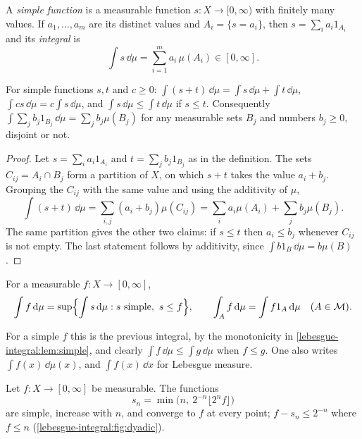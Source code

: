 \begin{notechapter}
\begin{definition}\label{lebesgue-integral:def:simple}
A \emph{simple function} is a measurable function $s:X\to[0, \infty)$
with finitely many values. If $a_1,\dots,a_m$ are its distinct values
and $A_i = \{s = a_i\}$, then $s = \sum_ia_i1_{A_i}$ and its
\emph{integral} is
\[
  \int s\,\dd\mu = \sum_{i=1}^ma_i\,\mu(A_i)\in[0, \infty] .
\]
\end{definition}

\begin{lemma}\label{lebesgue-integral:lem:simple}
For simple functions $s, t$ and $c\geq0$:
$\int(s + t)\,\dd\mu = \int s\,\dd\mu + \int t\,\dd\mu$,
$\int cs\,\dd\mu = c\int s\,\dd\mu$, and
$\int s\,\dd\mu\leq\int t\,\dd\mu$ if $s\leq t$. Consequently
$\int\sum_jb_j1_{B_j}\,\dd\mu = \sum_jb_j\mu(B_j)$ for any measurable sets
$B_j$ and numbers $b_j\geq0$, disjoint or not.
\end{lemma}

\begin{proof}
Let $s = \sum_ia_i1_{A_i}$ and $t = \sum_jb_j1_{B_j}$ as in the
definition. The sets $C_{ij} = A_i\cap B_j$ form a partition of $X$, on
which $s + t$ takes the value $a_i + b_j$. Grouping the $C_{ij}$ with
the same value and using the additivity of $\mu$,
\[
  \int(s + t)\,\dd\mu = \sum_{i,j}(a_i + b_j)\mu(C_{ij})
  = \sum_ia_i\mu(A_i) + \sum_jb_j\mu(B_j) .
\]
The same partition gives the other two claims: if $s\leq t$ then
$a_i\leq b_j$ whenever $C_{ij}$ is not empty. The last statement follows
by additivity, since $\int b1_B\,\dd\mu = b\mu(B)$.
\end{proof}

\begin{definition}
\label{lebesgue-integral:def:positive}
For a measurable $f:X\to[0, \infty]$,
\[
  \int f\,\mathrm{d}\mu
  = \sup\Bigl\{\int s\,\mathrm{d}\mu : s\text{ simple},\ s\leq f\Bigr\} ,
  \qquad
  \int_Af\,\mathrm{d}\mu = \int f1_A\,\mathrm{d}\mu \quad(A\in\mathcal M) .
\]
\end{definition}

For a simple $f$ this is the previous integral, by the monotonicity in
\cref{lebesgue-integral:lem:simple}, and clearly
$\int f\,\dd\mu\leq\int g\,\dd\mu$ when $f\leq g$. One also writes
$\int f(x)\,\dd\mu(x)$, and $\int f(x)\,\dd x$ for Lebesgue measure.

\begin{lemma}\label{lebesgue-integral:lem:dyadic}
Let $f:X\to[0, \infty]$ be measurable. The functions
\[
  s_n = \min\bigl(n,\ 2^{-n}\lfloor2^nf\rfloor\bigr)
\]
are simple, increase with $n$, and converge to $f$ at every point;
$f - s_n\leq2^{-n}$ where $f\leq n$
(\cref{lebesgue-integral:fig:dyadic}).
\end{lemma}


\end{notechapter}
